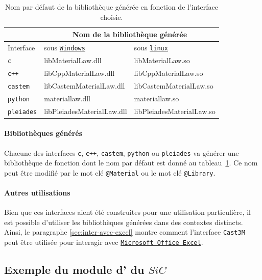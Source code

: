 \documentclass[12pt]{article}
\newcommand{\castem}{\texttt{Cast3M}}
\newcommand{\sic}{$SiC$}
\newcommand{\windows}{\href{http://www.microsoft.com/france/windows/default.mspx}{\texttt{Windows}}}
\newcommand{\linux}{\href{http://www.kernel.org/}{\texttt{linux}}}
\newcommand{\excel}{\href{http://www.microsoft.com/france/office/2007/programs/excel/overview.mspx}{\texttt{Microsoft Office Excel}}}
\begin{document}
\begin{table}[htbp]
  \centering
  \begin{tabular}[htbp]{|l|l|l|}
    \cline{2-3}
    \multicolumn{1}{c|}{\mbox{}} & \multicolumn{2}{c|}{Nom de la bibliothèque générée} \\
    \hline
    Interface & sous \windows{} & sous \linux{} \\
    \hline
    \hline
    \texttt{c}        & libMaterialLaw.dll       & libMaterialLaw.so    \\
    \hline
    \texttt{c++}      & libCppMaterialLaw.dll    & libCppMaterialLaw.so \\
    \hline
    \texttt{castem}   & libCastemMaterialLaw.dll & libCastemMaterialLaw.so \\
    \hline
    \texttt{python}   & materiallaw.dll & materiallaw.so\\
    \hline
    \texttt{pleiades} & libPleiadesMaterialLaw.dll 
                      & libPleiadesMaterialLaw.so   \\
    \hline
  \end{tabular}
  \caption{Nom par défaut de la bibliothèque générée en
    fonction de l'interface choisie.}
  \label{tab:biblio_vs_interface}
\end{table}

\paragraph{Bibliothèques générés} Chacune des interfaces \texttt{c},
\texttt{c++}, \texttt{castem}, \texttt{python} ou \texttt{pleiades} va
générer une bibliothèque de fonction dont le nom par défaut est donné au
tableau~\ref{tab:biblio_vs_interface}. Ce nom peut être modifié par
le mot clé {\tt @Material} ou le mot clé {\tt @Library}.

\paragraph{Autres utilisations} Bien que ces interfaces aient été
construites pour une utilisation particulière, il est possible
d'utiliser les bibliothèques générées dans des contextes
distincts. Ainsi, le paragraphe \ref{sec:inter-avec-excel} montre
comment l'interface \castem{} peut être utilisée pour interagir avec
\excel{}.

\subsection{Exemple du module d' du \sic{}}
\label{sec:module-dnomyoung-du}
\end{document}
